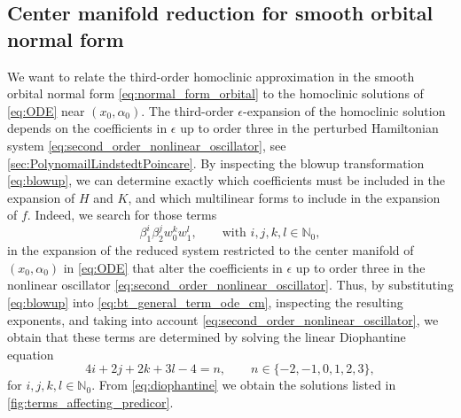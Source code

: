 \subsection{Center manifold reduction for smooth orbital normal form}
\label{subsec:center_manifold_tranformation_orbital}
We want to relate the third-order homoclinic approximation in the smooth
orbital normal form \cref{eq:normal_form_orbital} to the homoclinic solutions
of \cref{eq:ODE} near $(x_0,\alpha_0)$. The third-order $\epsilon$-expansion
of the homoclinic solution depends on the coefficients in $\epsilon$ up to order
three in the perturbed Hamiltonian system
\cref{eq:second_order_nonlinear_oscillator}, see
\cref{sec:PolynomailLindstedtPoincare}.  By inspecting the blowup
transformation \cref{eq:blowup}, we can determine exactly which coefficients
must be included in the expansion of $H$ and $K$, and which multilinear forms
to include in the expansion of $f$. Indeed, we search for those terms 
\begin{equation}
\label{eq:bt_general_term_ode_cm}
\beta_1^i\beta_2^jw_0^kw_1^l, \qquad \text{with }  i,j,k,l \in \mathbb N_0,
\end{equation}
in the expansion of the reduced system restricted to the center manifold of
$(x_0,\alpha_0)$ in \cref{eq:ODE} that alter the coefficients in $\epsilon$ up
to order three in the nonlinear oscillator
\cref{eq:second_order_nonlinear_oscillator}. Thus, by substituting
\cref{eq:blowup} into \cref{eq:bt_general_term_ode_cm}, inspecting the
resulting exponents, and taking into account
\cref{eq:second_order_nonlinear_oscillator}, we obtain that these terms are
determined by solving the linear Diophantine equation
\begin{equation}
    \label{eq:diophantine}
    4i + 2j + 2k + 3l - 4 = n, \qquad n\in\{-2,-1,0,1,2,3\},
\end{equation}
for $i,j,k,l \in \mathbb N_0$. From \cref{eq:diophantine} we obtain the
solutions listed in \cref{fig:terms_affecting_predicor}.
%
